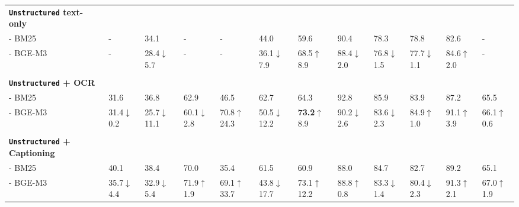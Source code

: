 \begin{table}[ht]
{\begin{tabular}{ll@{\hskip 0.5em}l@{\hskip 0.5em}l@{\hskip 0.5em}l@{\hskip 0.5em}l@{\hskip 0.5em}l@{\hskip 0.5em}l@{\hskip 0.5em}l@{\hskip 0.5em}l@{\hskip 0.5em}l|@{\hskip 0.5em}l}
\midrule
    \multicolumn{0}{l}{\textbf{\texttt{Unstructured} \tiny text-only}}&&&&&&&&&&&\\
- BM25 & - & 34.1 & - & - & 44.0 & 59.6 & 90.4 & 78.3 & 78.8 & 82.6 &-\\
- BGE-M3 & - & 28.4\textcolor{red!75!black}{\tiny $\downarrow$5.7} & - & - & 36.1\textcolor{red!75!black}{\tiny $\downarrow$7.9} & 68.5\textcolor{green!75!black}{\tiny $\uparrow$8.9} & 88.4\textcolor{red!75!black}{\tiny $\downarrow$2.0} & 76.8\textcolor{red!75!black}{\tiny $\downarrow$1.5} & 77.7\textcolor{red!75!black}{\tiny $\downarrow$1.1} & 84.6\textcolor{green!75!black}{\tiny $\uparrow$2.0} & -\\
\\
\multicolumn{0}{l}{\textbf{\texttt{Unstructured} \tiny+ OCR}}&&&&&&&&&&&\\
- BM25 & 31.6 & 36.8 & 62.9 & 46.5 & 62.7 & 64.3 & 92.8 & 85.9 & 83.9 & 87.2 & 65.5\\
- BGE-M3 & 31.4\textcolor{red!75!black}{\tiny $\downarrow$0.2} & 25.7\textcolor{red!75!black}{\tiny $\downarrow$11.1} & 60.1\textcolor{red!75!black}{\tiny $\downarrow$2.8} & 70.8\textcolor{green!75!black}{\tiny $\uparrow$24.3} & 50.5\textcolor{red!75!black}{\tiny $\downarrow$12.2} & \textbf{73.2}\textcolor{green!75!black}{\tiny $\uparrow$8.9} & 90.2\textcolor{red!75!black}{\tiny $\downarrow$2.6} & 83.6\textcolor{red!75!black}{\tiny $\downarrow$2.3} & 84.9\textcolor{green!75!black}{\tiny $\uparrow$1.0} & 91.1\textcolor{green!75!black}{\tiny $\uparrow$3.9} & 66.1\textcolor{green!75!black}{\tiny $\uparrow$0.6}\\
\\
\multicolumn{0}{l}{\textbf{\texttt{Unstructured} \tiny+ Captioning}}&&&&&&&&&&&\\
- BM25 & 40.1 & 38.4 & 70.0 & 35.4 & 61.5 & 60.9 & 88.0 & 84.7 & 82.7 & 89.2 
& 65.1\\
- BGE-M3 & 35.7\textcolor{red!75!black}{\tiny $\downarrow$4.4} & 32.9\textcolor{red!75!black}{\tiny $\downarrow$5.4} & 71.9\textcolor{green!75!black}{\tiny $\uparrow$1.9} & 69.1\textcolor{green!75!black}{\tiny $\uparrow$33.7} & 43.8\textcolor{red!75!black}{\tiny $\downarrow$17.7} & 73.1\textcolor{green!75!black}{\tiny $\uparrow$12.2} & 88.8\textcolor{green!75!black}{\tiny $\uparrow$0.8} & 83.3\textcolor{red!75!black}{\tiny $\downarrow$1.4} & 80.4\textcolor{red!75!black}{\tiny $\downarrow$2.3} & 91.3\textcolor{green!75!black}{\tiny $\uparrow$2.1} & 67.0\textcolor{green!75!black}{\tiny $\uparrow$1.9}\\
    \midrule

\end{tabular}}
\end{table}
